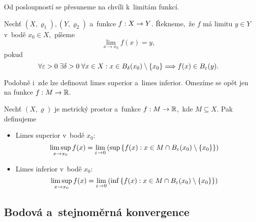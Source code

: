 Od posloupností se přesuneme na chvíli k~limitám funkcí.
\begin{definition}\label{def:limita-fce-v-bode}
    Nechť $(X,\varrho_1),(Y,\varrho_2)$ a~funkce $f:X \rightarrow Y$. Řekneme,~že $f$ má limitu $y\in Y$ v~bodě $x_0\in X$,~píšeme
    \[\lim_{x\to x_0}f(x)=y,\]
    pokud
    \[\forall \varepsilon >0\;\exists \delta >0\;\forall x\in X: x\in B_\delta(x_0)\setminus\left\{x_0\right\}\Longrightarrow f(x)\in B_\varepsilon(y).\]
\end{definition}
Podobně i~zde lze definovat limes superior a~limes inferior. Omezíme se opět jen na funkce $f:M \rightarrow \mathbb{R}$.
\begin{definition}\label{def:limsup-liminf-funkce}
    Nechť $(X,\varrho)$ je metrický prostor a~funkce $f:M \rightarrow \mathbb{R}$,~kde $M\subseteq X$. Pak definujeme
    \begin{itemize}
        \item Limes superior v~bodě $x_0$:
        \[\limsup _{x\to x_0}f(x)=\lim _{\varepsilon \to 0}\left(\sup\left\{f(x):x\in M\cap B_\varepsilon(x_0)\setminus \{x_0\}\right\}\right)\]
        \item Limes inferior v~bodě $x_0$:
        \[\limsup _{x\to x_0}f(x)=\lim _{\varepsilon \to 0}\left(\inf\left\{f(x):x\in M\cap B_\varepsilon(x_0)\setminus \{x_0\}\right\}\right)\]
    \end{itemize}
\end{definition}

\subsection{Bodová a~stejnoměrná konvergence}\label{subsec:bodova-stejnomerna-konvergence}


